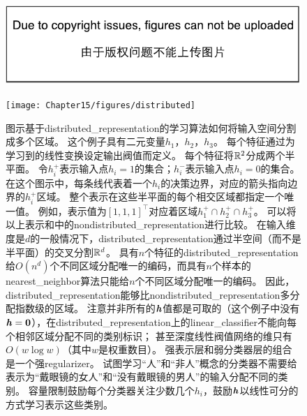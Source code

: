 

\begin{figure}[!htb]
\ifOpenSource
\centerline{\includegraphics{figure.pdf}}
\else
\centerline{\texttt{[image: Chapter15/figures/distributed]}}
\fi
\caption{图示基于\gls{distributed_representation}的学习算法如何将输入空间分割成多个区域。
这个例子具有二元变量$h_1$，$h_2$，$h_3$。
每个特征通过为学习到的线性变换设定输出阀值而定义。
每个特征将$\mathbb{R}^2$分成两个半平面。
令$h_i^+$表示输入点$h_i=1$的集合；$h_i^-$表示输入点$h_i=0$的集合。
在这个图示中，每条线代表着一个$h_i$的决策边界，对应的箭头指向边界的$h_i^+$区域。
整个表示在这些半平面的每个相交区域都指定一个唯一值。
例如，表示值为$[1,1,1]^\top$对应着区域$h_1^+ \cap h_2^+ \cap h_3^+$。
可以将以上表示和中的\gls{nondistributed_representation}进行比较。
在输入维度是$d$的一般情况下，\gls{distributed_representation}通过半空间（而不是半平面）的交叉分割$\mathbb{R}^d$。
具有$n$个特征的\gls{distributed_representation}给$O(n^d)$个不同区域分配唯一的编码，而具有$n$个样本的\gls{nearest_neighbor}算法只能给$n$个不同区域分配唯一的编码。
因此，\gls{distributed_representation}能够比\gls{nondistributed_representation}多分配指数级的区域。
注意并非所有的$\boldsymbol{\mathit{h}}$值都是可取的（这个例子中没有$\boldsymbol{\mathit{h}}=\mathbf{0}$），在\gls{distributed_representation}上的\gls{linear_classifier}不能向每个相邻区域分配不同的类别标识；
甚至深度线性阀值网络的维只有$O(w\log w)$（其中$w$是权重数目）\citep{sontag1998vc}。
强表示层和弱分类器层的组合是一个强\gls{regularizer}。
试图学习``人''和``非人''概念的分类器不需要给表示为``戴眼镜的女人''和``没有戴眼镜的男人''的输入分配不同的类别。
容量限制鼓励每个分类器关注少数几个$h_i$，鼓励$\boldsymbol{\mathit{h}}$以线性可分的方式学习表示这些类别。
}
\label{fig:chap15_distributed}
\end{figure}



